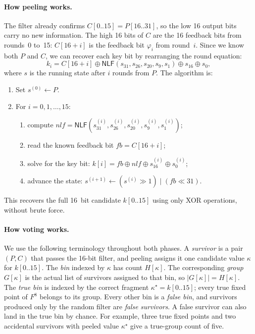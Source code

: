 \documentclass[version=preprint]{iacrcc}
\providecommand{\NLF}{\mathsf{NLF}}
\begin{document}
\paragraph{How peeling works.}
The filter already confirms $C[0..15] = P[16..31]$, so the low 16 output bits carry no new information.
The high 16 bits of $C$ are the 16 feedback bits from rounds~0 to~15:
$C[16+i]$ is the feedback bit $\varphi_i$ from round~$i$.
Since we know both $P$ and $C$, we can recover each key bit by rearranging the round equation:
\[
k_i = C[16+i] \oplus \NLF(s_{31},s_{26},s_{20},s_9,s_1) \oplus s_{16} \oplus s_0,
\]
where $s$ is the running state after $i$ rounds from $P$.
The algorithm is:
\begin{enumerate}
  \item Set $s^{(0)} \leftarrow P$.
  \item For $i = 0, 1, \ldots, 15$:
  \begin{enumerate}
    \item compute $\mathit{nlf} = \NLF(s^{(i)}_{31}, s^{(i)}_{26}, s^{(i)}_{20}, s^{(i)}_9, s^{(i)}_1)$;
    \item read the known feedback bit $\mathit{fb} = C[16+i]$;
    \item solve for the key bit: $k[i] = \mathit{fb} \oplus \mathit{nlf} \oplus s^{(i)}_{16} \oplus s^{(i)}_0$;
    \item advance the state: $s^{(i+1)} \leftarrow (s^{(i)} \gg 1) \mid (\mathit{fb} \ll 31)$.
  \end{enumerate}
\end{enumerate}
This recovers the full 16~bit candidate $k[0..15]$ using only XOR operations, without brute force.

\paragraph{How voting works.}
We use the following terminology throughout both phases.
A \emph{survivor} is a pair $(P,C)$ that passes the 16-bit filter, and peeling assigns it one candidate value $\kappa$ for $k[0..15]$.
The \emph{bin} indexed by $\kappa$ has count $H[\kappa]$.
The corresponding \emph{group} $G[\kappa]$ is the actual list of survivors assigned to that bin, so $|G[\kappa]|=H[\kappa]$.
The \emph{true bin} is indexed by the correct fragment $\kappa^{\star}=k[0..15]$; every true fixed point of $F^8$ belongs to its group.
Every other bin is a \emph{false bin}, and survivors produced only by the random filter are \emph{false survivors}.
A false survivor can also land in the true bin by chance.
For example, three true fixed points and two accidental survivors with peeled value $\kappa^{\star}$ give a true-group count of five.
\end{document}
